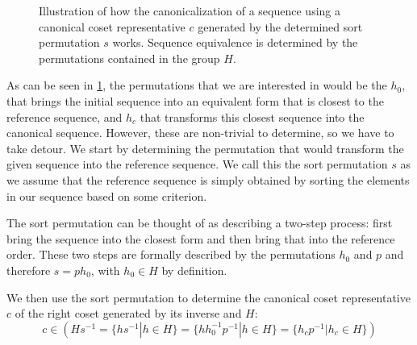 \documentclass[parskip=half]{scrartcl}
\begin{document}
	\begin{figure}[!htb]

		\caption{Illustration of how the canonicalization of a sequence using a canonical coset representative $c$ generated by the determined sort
		permutation $s$ works. Sequence equivalence is determined by the permutations contained in the group $H$.}
		\label{fig:SequenceCanonicalization}
	\end{figure}

	As can be seen in \cref{fig:SequenceCanonicalization}, the permutations that we are interested in would be the $h_0$, that brings the initial
	sequence into an equivalent form that is closest to the reference sequence, and $h_c$ that transforms this closest sequence into the canonical
	sequence. However, these are non-trivial to determine, so we have to take detour. We start by determining the permutation that would transform the
	given sequence into the reference sequence. We call this the sort permutation $s$ as we assume that the reference sequence is simply obtained by
	sorting the elements in our sequence based on some criterion.

	The sort permutation can be thought of as describing a two-step process: first bring the sequence into the closest form and then bring that into
	the reference order. These two steps are formally described by the permutations $h_0$ and $p$ and therefore $s = p h_0$, with
	$h_0 \in H$ by definition.

	We then use the sort permutation to determine the canonical coset representative $c$ of the right coset generated by its inverse and $H$:
	\begin{equation}
		c \in \left( H s^{-1} = \{ h s^{-1} | h \in H \} = \{ h h_0^{-1} p^{-1} | h \in H \} = \{ h_c p^{-1} | h_c \in H \} \right)
	\end{equation}
\end{document}
